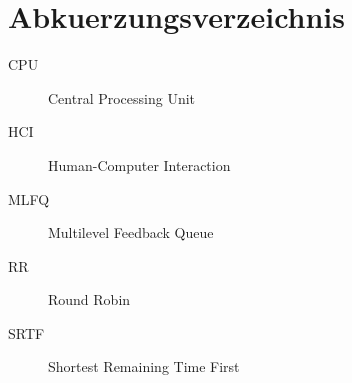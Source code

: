 \chapter*{Abkuerzungsverzeichnis}

\begin{description}
  \item[CPU] Central Processing Unit
  \item[HCI] Human-Computer Interaction
  \item[MLFQ] Multilevel Feedback Queue
  \item[RR] Round Robin
  \item[SRTF] Shortest Remaining Time First
\end{description}
